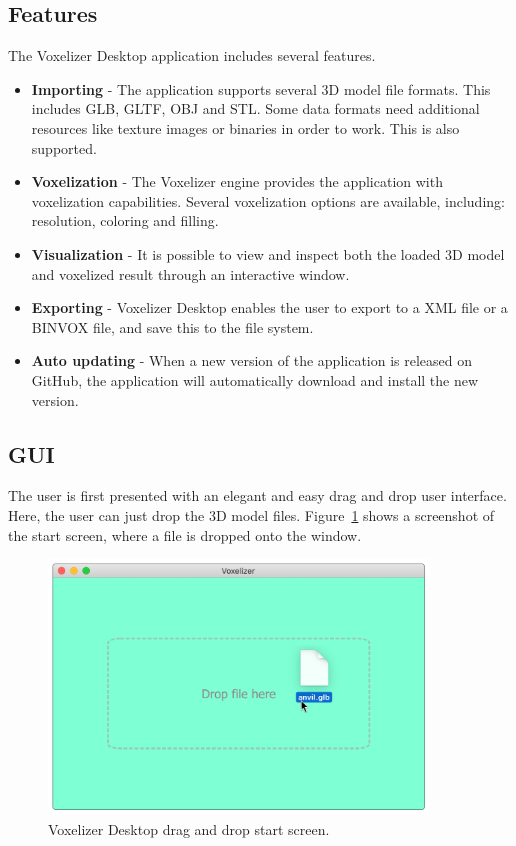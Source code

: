 \subsection{Features}
The Voxelizer Desktop application includes several features.
\begin{itemize}
    \item \textbf{Importing} - The application supports several 3D model file formats. This includes GLB, GLTF, OBJ and STL. Some data formats need additional resources like texture images or binaries in order to work. This is also supported.
    \item \textbf{Voxelization} - The Voxelizer engine provides the application with voxelization capabilities. Several voxelization options are available, including: resolution, coloring and filling.
    \item \textbf{Visualization} - It is possible to view and inspect both the loaded 3D model and voxelized result through an interactive window.
    \item \textbf{Exporting} - Voxelizer Desktop enables the user to export to a XML file or a BINVOX file, and save this to the file system.
    \item \textbf{Auto updating} - When a new version of the application is released on GitHub, the application will automatically download and install the new version.
\end{itemize}

\subsection{GUI}
The user is first presented with an elegant and easy drag and drop user interface. Here, the user can just drop the 3D model files. Figure~\ref{fig:voxelizer-desktop-gui-dnd} shows a screenshot of the start screen, where a file is dropped onto the window.
\begin{figure}[htp]
    \centering
    \includegraphics[width=0.9\textwidth]{sections/result/figures/voxelizer-desktop-gui-dnd.png}
    \caption{Voxelizer Desktop drag and drop start screen.}
    \label{fig:voxelizer-desktop-gui-dnd}
\end{figure}

